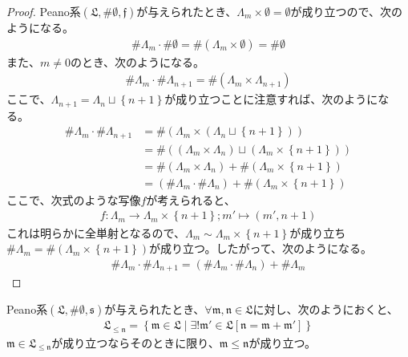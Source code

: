 \documentclass[dvipdfmx]{jsarticle}
\begin{document}
\begin{proof}
Peano系$\left( \mathfrak{L,}\# \emptyset ,\mathfrak{f} \right)$が与えられたとき、$\varLambda_{m} \times \emptyset  = \emptyset $が成り立つので、次のようになる。
\begin{align*}
\# \varLambda_{m} \cdot \# \emptyset  = \# \left( \varLambda_{m} \times \emptyset  \right) = \# \emptyset 
\end{align*}
また、$m \neq 0$のとき、次のようになる。
\begin{align*}
\# \varLambda_{m} \cdot \# \varLambda_{n + 1} = \# \left( \varLambda_{m} \times \varLambda_{n + 1} \right)
\end{align*}
ここで、$\varLambda_{n + 1} = \varLambda_{n} \sqcup \left\{ n + 1 \right\}$が成り立つことに注意すれば、次のようになる。
\begin{align*}
\# \varLambda_{m} \cdot \# \varLambda_{n + 1} &= \# \left( \varLambda_{m} \times \left( \varLambda_{n} \sqcup \left\{ n + 1 \right\} \right) \right)\\
&= \# \left( \left( \varLambda_{m} \times \varLambda_{n} \right) \sqcup \left( \varLambda_{m} \times \left\{ n + 1 \right\} \right) \right)\\
&= \# \left( \varLambda_{m} \times \varLambda_{n} \right) + \# \left( \varLambda_{m} \times \left\{ n + 1 \right\} \right)\\
&= \left( \# \varLambda_{m} \cdot \# \varLambda_{n} \right) + \# \left( \varLambda_{m} \times \left\{ n + 1 \right\} \right)
\end{align*}
ここで、次式のような写像$f$が考えられると、
\begin{align*}
f:\varLambda_{m} \rightarrow \varLambda_{m} \times \left\{ n + 1 \right\};m' \mapsto \left( m',n + 1 \right)
\end{align*}
これは明らかに全単射となるので、$\varLambda_{m} \sim \varLambda_{m} \times \left\{ n + 1 \right\}$が成り立ち$\# \varLambda_{m} = \# \left( \varLambda_{m} \times \left\{ n + 1 \right\} \right)$が成り立つ。したがって、次のようになる。
\begin{align*}
\# \varLambda_{m} \cdot \# \varLambda_{n + 1} = \left( \# \varLambda_{m} \cdot \# \varLambda_{n} \right) + \# \varLambda_{m}
\end{align*}
\end{proof}
\begin{thm}\label{1.2.8.14}
Peano系$\left( \mathfrak{L,}\# \emptyset ,\mathfrak{s} \right)$が与えられたとき、$\mathfrak{\forall m,n \in L}$に対し、次のようにおくと、
\begin{align*}
\mathfrak{L}_{\mathfrak{\leq n}} = \left\{ \mathfrak{m \in L} \middle| \exists!\mathfrak{m}'\in \mathfrak{L}\left[ \mathfrak{n = m +}\mathfrak{m}' \right] \right\}
\end{align*}
$\mathfrak{m \in}\mathfrak{L}_{\mathfrak{\leq n}}$が成り立つならそのときに限り、$\mathfrak{m \leq n}$が成り立つ。
\end{thm}
\end{document}
